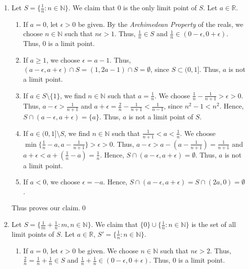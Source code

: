 \documentclass[10pt]{article}
\begin{document}
\begin{enumerate}
                \item Let $S = \{\frac{1}{n}: n \in \mathbb{N}\}$. We claim that $0$ is the only limit point of $S$.
                Let $a \in \mathbb{R}$.
                \begin{enumerate}
                        \item If $a = 0$, let $\epsilon > 0$ be given. By the \emph{Archimedean Property} of the reals,
                        we choose $n \in \mathbb{N}$ such that $n\epsilon > 1$. Thus, $\frac{1}{n} \in S$ and
                        $\frac{1}{n} \in (0 - \epsilon, 0 + \epsilon)$. Thus, $0$ is a limit point.

                        \item If $a \ge 1$, we choose $\epsilon = a - 1$. Thus, $(a - \epsilon, a + \epsilon) \cap S = 
                        (1, 2a - 1) \cap S = \emptyset$, since $S \subset (0, 1]$. Thus, $a$ is not a limit point.

                        \item If $a \in S\setminus\{1\}$, we find $n \in \mathbb{N}$ such that $a = \frac{1}{n}$. We choose
                        $\frac{1}{n} - \frac{1}{n+1} > \epsilon > 0$. Thus, $a - \epsilon > \frac{1}{n+1}$ and
                        $a + \epsilon = \frac{2}{n} - \frac{1}{n+1} < \frac{1}{n-1}$, since $n^2 - 1 < n^2$.
                        Hence, $S \cap (a - \epsilon, a + \epsilon) = \{a\}$.
                        Thus, $a$ is not a limit point of $S$.

                        \item If $a \in (0, 1]\setminus S$, we find $n \in \mathbb{N}$ such that $\frac{1}{n+1} < a < \frac{1}{n}$.
                        We choose $\min\{\frac{1}{n} - a, a - \frac{1}{n + 1}\} > \epsilon > 0$.
                        Thus, $a - \epsilon > a - (a - \frac{1}{n+1}) = \frac{1}{n+1}$ and $a + \epsilon < a + (\frac{1}{n} - a) = \frac{1}{n}$.
                        Hence, $S \cap (a - \epsilon, a + \epsilon) = \emptyset$. Thus, $a$ is not a limit point.
                        
                        \item If $a < 0$, we choose $\epsilon = -a$. Hence, $S \cap (a - \epsilon, a + \epsilon) = 
                        S \cap (2a, 0) = \emptyset$.
                \end{enumerate}
                Thus proves our claim.\qed

                \item Let $S = \{\frac{1}{m} + \frac{1}{n}: m,n \in \mathbb{N}\}$. We claim that $\{0\} \cup \{\frac{1}{n}: n \in \mathbb{N}\}$
                is the set of all limit points of $S$.
                Let $a \in \mathbb{R}$, $S' = \{\frac{1}{n}: n \in \mathbb{N}\}$.
                \begin{enumerate}
                        \item If $a = 0$, let $\epsilon > 0$ be given. We choose $n \in \mathbb{N}$ such that $n\epsilon > 2$.
                        Thus, $\frac{2}{n} = \frac{1}{n} + \frac{1}{n} \in S$ and $\frac{1}{n} + \frac{1}{n} \in (0-\epsilon, 0+\epsilon)$.
                        Thus, $0$ is a limit point.


\end{enumerate}
\end{enumerate}
\end{document}
